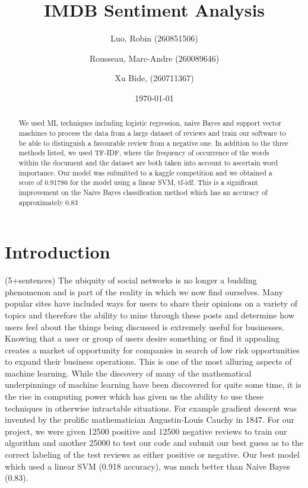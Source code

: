 \documentclass{amsart}
\theoremstyle{definition}
\theoremstyle{remark}
\numberwithin{equation}{section}
\begin{document}
\vspace*{-80pt}

\title{IMDB Sentiment Analysis}

\author{Luo, Robin (260851506)}
\author{Rousseau, Marc-Andre  (260089646)}
\author{Xu Bide, (260711367)}

\date{\today}
\begin{abstract}
We used ML techniques including logistic regression, naive Bayes and support vector machines to process the data from a large dataset of reviews and train our software to be able to distinguish a favourable review from a negative one.  In addition to the three methods listed, we used TF-IDF, where the frequency of occurrence of the words within the document and the dataset are both taken into account to ascertain word importance.  Our model was submitted to a kaggle competition and we obtained a score of 0.91786 for the model using a linear SVM, tf-idf.  This is a significant improvement on the Naive Bayes classification method which has an accuracy of approximately 0.83 \end{abstract}
\maketitle
\section{Introduction}(5+sentences)
The ubiquity of social networks is no longer a budding phenomenon and is part of the reality in which we now find ourselves.  Many popular sites have included ways for users to share their opinions on a variety of topics and therefore the ability to mine through these posts and determine how users feel about the things being discussed is extremely useful for businesses.  Knowing that a user or group of users desire something or find it appealing creates a market of opportunity for companies in search of low risk opportunities to expand their business operations.  This is one of the most alluring aspects of machine learning.  While the discovery of many of the mathematical underpinnings of machine learning have been discovered for quite some time, it is the rise in computing power which has given us the ability to use these techniques in otherwise intractable situations.  For example gradient descent was invented by the prolific mathematician Augustin-Louis Cauchy in 1847.  For our project, we were given 12500 positive and 12500 negative reviews to train our algorithm and another 25000 to test our code and submit our best guess as to the correct labeling of the test reviews as either positive or negative.  Our best model which used a linear SVM (0.918 accuracy), was much better than Naive Bayes (0.83).
\end{document}
